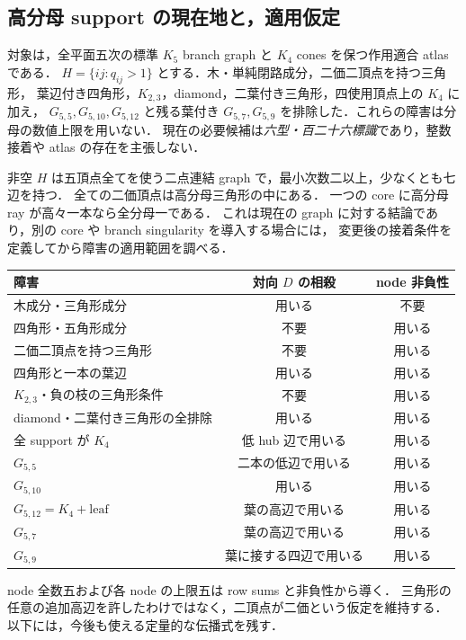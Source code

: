 \subsection{高分母 support の現在地と，適用仮定}
\label{ns19:current-support}

対象は，全平面五次の標準 $K_5$ branch graph と $K_4$ cones を保つ作用適合 atlas である．
$H=\{ij:q_{ij}>1\}$ とする．木・単純閉路成分，二価二頂点を持つ三角形，
葉辺付き四角形，$K_{2,3}$，diamond，二葉付き三角形，四使用頂点上の $K_4$ に加え，
$G_{5,5},G_{5,10},G_{5,12}$ と残る葉付き $G_{5,7},G_{5,9}$ を排除した．これらの障害は分母の数値上限を用いない．
現在の必要候補は\emph{六型・百二十六標識}であり，整数接着や atlas の存在を主張しない．

非空 $H$ は五頂点全てを使う二点連結 graph で，最小次数二以上，少なくとも七辺を持つ．
全ての二価頂点は高分母三角形の中にある．
一つの core に高分母 ray が高々一本なら全分母一である．
これは現在の graph に対する結論であり，別の core や branch singularity を導入する場合には，
変更後の接着条件を定義してから障害の適用範囲を調べる．

\begin{center}
\begin{tabular}{lcc}
障害 & 対向 $D$ の相殺 & node 非負性\\\hline
木成分・三角形成分 & 用いる & 不要\\
四角形・五角形成分 & 不要 & 用いる\\
二価二頂点を持つ三角形 & 不要 & 用いる\\
四角形と一本の葉辺 & 用いる & 用いる\\
$K_{2,3}$・負の枝の三角形条件 & 不要 & 用いる\\
diamond・二葉付き三角形の全排除 & 用いる & 用いる\\
全 support が $K_4$ & 低 hub 辺で用いる & 用いる\\
$G_{5,5}$ & 二本の低辺で用いる & 用いる\\
$G_{5,10}$ & 用いる & 用いる\\
$G_{5,12}=K_4+\mathrm{leaf}$ & 葉の高辺で用いる & 用いる\\
$G_{5,7}$ & 葉の高辺で用いる & 用いる\\
$G_{5,9}$ & 葉に接する四辺で用いる & 用いる
\end{tabular}
\end{center}
node 全数五および各 node の上限五は row sums と非負性から導く．
三角形の任意の追加高辺を許したわけではなく，二頂点が二価という仮定を維持する．
以下には，今後も使える定量的な伝播式を残す．

